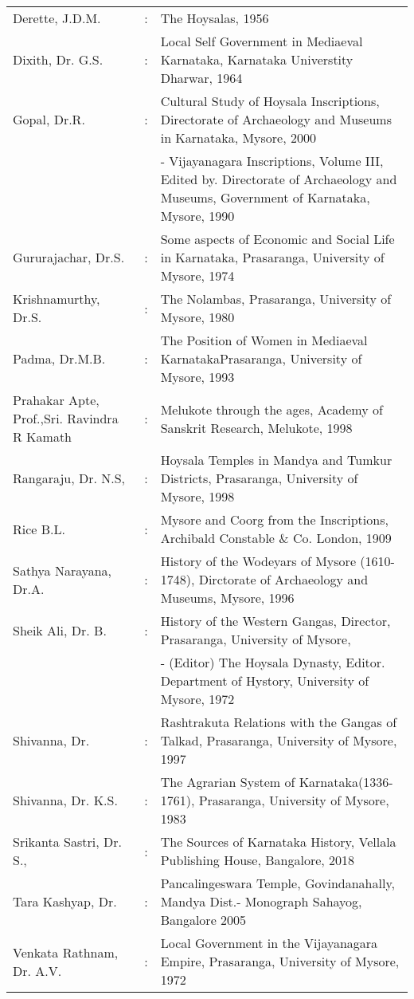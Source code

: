 \begin{longtable}[l]{@{}>{\raggedright}p{4.5cm}cp{9.3cm}<{\raggedright}@{}}
Derette, J.D.M. & : & The Hoysalas, 1956\\
Dixith, Dr. G.S. & : & Local Self Government in Mediaeval Karnataka, Karnataka Universtity Dharwar, 1964\\
Gopal, Dr.R. & : &  Cultural Study of Hoysala Inscriptions, Directorate of Archaeology and Museums in Karnataka, Mysore, 2000\\
&& - Vijayanagara Inscriptions, Volume III, Edited by. Directorate of Archaeology and Museums, Government of Karnataka, Mysore, 1990\\
Gururajachar, Dr.S. & : & Some aspects of Economic and Social Life in Karnataka, Prasaranga, University of Mysore, 1974\\
Krishnamurthy, Dr.S. & : & The Nolambas, Prasaranga, University of Mysore, 1980\\
Padma, Dr.M.B. & : & The Position of Women in Mediaeval KarnatakaPrasaranga, University of Mysore, 1993\\
Prahakar Apte, Prof.,\newline Sri. Ravindra R Kamath & : & Melukote through the ages, Academy of Sanskrit Research, Melukote, 1998\\
Rangaraju, Dr. N.S, & : & Hoysala Temples in Mandya and Tumkur Districts, Prasaranga, University of Mysore, 1998\\
Rice B.L. & : & Mysore and Coorg from the Inscriptions, Archibald Constable \& Co. London, 1909\\
Sathya Narayana, Dr.A. & : & History of the Wodeyars of Mysore (1610-1748), Dirctorate of Archaeology and Museums, Mysore, 1996\\
Sheik Ali, Dr. B. & : & History of the Western Gangas, Director, Prasaranga, University of Mysore,\\
&& - (Editor) The Hoysala Dynasty, Editor. Department of Hystory, University of Mysore, 1972\\
Shivanna, Dr. & : & Rashtrakuta Relations with the Gangas of Talkad, Prasaranga, University of Mysore, 1997\\
Shivanna, Dr. K.S. & : & The Agrarian System of Karnataka(1336-1761), Prasaranga, University of Mysore, 1983\\
Srikanta Sastri, Dr. S., & : & The Sources of Karnataka History, Vellala Publishing House, Bangalore, 2018\\
Tara Kashyap, Dr. & : & Pancalingeswara Temple, Govindanahally, Mandya Dist.- Monograph Sahayog, Bangalore 2005\\
Venkata Rathnam, Dr. A.V. & : & Local Government in the Vijayanagara Empire, Prasaranga, University of Mysore, 1972\\
\end{longtable}

